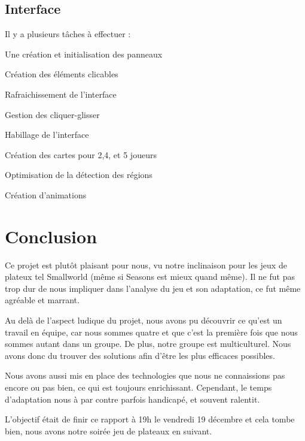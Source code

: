 \documentclass[11pt]{report}
\begin{document}
	\section{Interface}
	
	Il y a plusieurs tâches à effectuer :
	\begin{description}
	\item Une création et initialisation des panneaux
	\item Création des éléments clicables
	\item Rafraichissement de l'interface
	\item Gestion des cliquer-glisser
	\item Habillage de l'interface
	\item Création des cartes pour 2,4, et 5 joueurs
	\item Optimisation de la détection des régions
	\item Création d'animations
	
	\end{description}

\chapter{Conclusion}
	Ce projet est plutôt plaisant pour nous, vu notre inclinaison pour les jeux de plateux tel Smallworld\up{\copyright} (même si Seasons est mieux quand même). Il ne fut pas trop dur de nous impliquer dans l'analyse du jeu et son adaptation, ce fut même agréable et marrant.
	
	Au delà de l'aspect ludique du projet, nous avons pu découvrir ce qu'est un travail en équipe, car nous sommes quatre et que c'est la première fois que nous sommes autant dans un groupe. De plus, notre groupe est multiculturel. Nous avons donc du trouver des solutions afin d'être les plus efficaces possibles.
	
	Nous avons aussi mis en place des technologies que nous ne connaissions pas encore ou pas bien, ce qui est toujours enrichissant. Cependant, le temps d'adaptation nous à par contre parfois handicapé, et souvent ralentit.
	
	L'objectif était de finir ce rapport à 19h le vendredi 19 décembre et cela tombe bien, nous avons notre soirée jeu de plateaux en suivant. 
\end{document}
